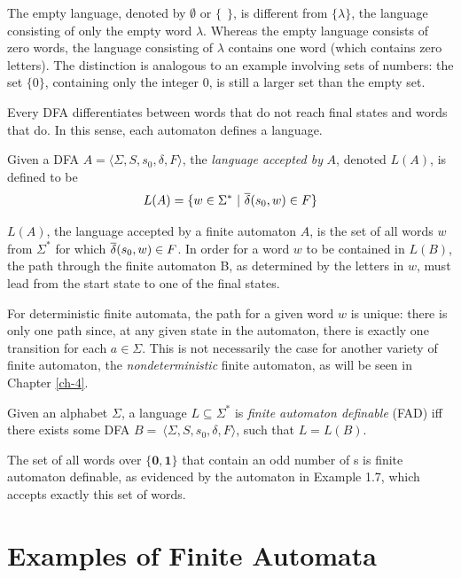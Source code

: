 The empty language, denoted by $\emptyset$ or $\{\ \ \}$, is different from
$\{\lambda\}$, the language consisting of only the empty word $\lambda$. Whereas
the empty language consists of zero words, the language consisting of $\lambda$
contains one word (which contains zero letters). The distinction is analogous to
an example involving sets of numbers: the set $\{0\}$, containing only the
integer $0$, is still a larger set than the empty set.

Every DFA differentiates between words that do not reach final states and 
words that do. In this sense, each automaton defines a language.

\begin{dfn}\label{dfn-1.15}
Given a DFA $A = \langle\Sigma,S,s_0,\delta,F\rangle$, the \emph{language accepted by}
$A$, denoted $L(A)$, is defined to be 
\[L(A) = \{w \in \Sigma^*\ | \ \overline{\delta}(s_0, w) \in F\}\]
\end{dfn}

$L(A)$, the language accepted by a finite automaton $A$, is the set of all words
$w$ from $\Sigma^*$ for which $\overline{\delta}(s_0, w) \in F$. In order for a
word $w$ to be contained in $L(B)$, the path through the finite automaton B, as
determined by the letters in $w$, must lead from the start state to one of the
final states.

For deterministic finite automata, the path for a given word $w$ is unique:
there is only one path since, at any given state in the automaton, there is
exactly one transition for each $a \in \Sigma$. This is not necessarily the case
for another variety of finite automaton, the \emph{nondeterministic} finite
automaton, as will be seen in Chapter \ref{ch-4}.

\begin{dfn}\label{dfn-1.16}
Given an alphabet $\Sigma$, a language $L \subseteq \Sigma^*$ is 
\emph{finite automaton definable} (FAD) iff there exists some DFA
$B =\ \langle\Sigma,S,s_0,\delta,F\rangle$, such that $L = L(B)$.
\end{dfn}

The set of all words over $\{\pmb{0,1}\}$ that contain an odd number of
s is finite
automaton definable, as evidenced by the automaton in Example 1.7,
which accepts exactly this set of words.

\section{Examples of Finite Automata}\label{sec-1.3}

